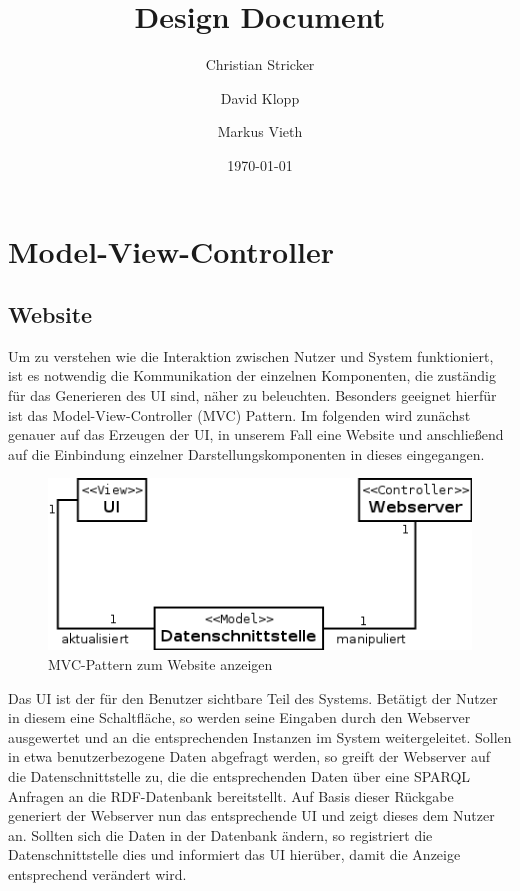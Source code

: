 \documentclass{book}
\title{Design Document}
\author{Christian Stricker \and David Klopp \and Markus Vieth}
\date{\today}
\begin{document}
\section{Model-View-Controller}

\subsection*{Website}
\noindent Um zu verstehen wie die Interaktion zwischen Nutzer und System funktioniert, ist es notwendig die Kommunikation der einzelnen Komponenten, die zuständig für das Generieren des UI sind, näher zu beleuchten. 
Besonders geeignet hierfür ist das Model-View-Controller (MVC) Pattern. 
Im folgenden wird zunächst genauer auf das Erzeugen der UI, in unserem Fall eine Website und anschließend auf die Einbindung einzelner Darstellungskomponenten in dieses eingegangen. \\

\begin{figure}[h]
\centering
\includegraphics[width=1.0\linewidth]{Grafik/Diagramm/Pattern/MVC/Website/Kontextdiagramm.png}
\caption[MVC Website Klassen]{MVC-Pattern zum Website anzeigen}
\end{figure}

\noindent  Das UI ist der für den Benutzer sichtbare Teil des Systems. Betätigt der Nutzer in diesem eine Schaltfläche, so werden seine Eingaben durch den Webserver ausgewertet und an die entsprechenden Instanzen im System weitergeleitet. Sollen in etwa benutzerbezogene Daten abgefragt werden, so greift der Webserver auf die Datenschnittstelle zu, die die entsprechenden Daten über eine SPARQL Anfragen an die RDF-Datenbank bereitstellt. Auf Basis dieser Rückgabe generiert der Webserver nun das entsprechende UI und  zeigt dieses dem Nutzer an.
Sollten sich die Daten in der Datenbank ändern, so registriert die Datenschnittstelle dies und informiert das UI hierüber, damit die Anzeige entsprechend verändert wird.
\end{document}

